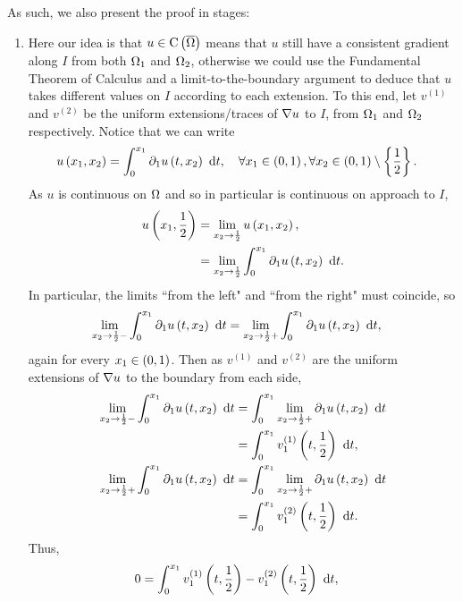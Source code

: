 \documentclass[11pt]{report}
\theoremstyle{plain}
\begin{document}
As such, we also present the proof in stages:
\begin{enumerate}
	\item Here our idea is that $u\in\mathrm{C}\left( \overline{\Omega} \right)$ means that $u$ still have a consistent gradient along $I$ from both $\Omega_1$ and $\Omega_2$, otherwise we could use the Fundamental Theorem of Calculus and a limit-to-the-boundary argument to deduce that $u$ takes different values on $I$ according to each extension.
	To this end, let $v^{(1)}$ and $v^{(2)}$ be the uniform extensions/traces of $\nabla u$ to $I$, from $\Omega_1$ and $\Omega_2$ respectively.
	Notice that we can write
	\begin{align}
		u\bracs{x_1,x_2} &= \int_0^{x_1} \partial_1 u\bracs{t,x_2} \ \md t,
		\quad \forall x_1\in\bracs{0,1}, \forall x_2\in\bracs{0,1}\setminus\clbracs{\recip{2}}.
	\end{align}
	As $u$ is continuous on $\Omega$ and so in particular is continuous on approach to $I$,
	\begin{align}
		u\left( x_1,\frac{1}{2} \right) &= \lim_{x_2\rightarrow \frac{1}{2}} u\left( x_1,x_2 \right), \\
		&= \lim_{x_2\rightarrow\frac{1}{2}} \int_0^{x_1} \partial_1 u\left( t,x_2 \right) \ \mathrm{d} t.
	\end{align}
	In particular, the limits ``from the left" and ``from the right" must coincide, so
	\begin{align}
		\lim_{x_2\rightarrow\frac{1}{2}-} \int_0^{x_1} \partial_1 u\left( t,x_2 \right) \ \mathrm{d} t 
		&= \lim_{x_2\rightarrow\frac{1}{2}+} \int_0^{x_1} \partial_1 u\left( t,x_2 \right) \ \mathrm{d} t,
	\end{align}
	again for every $x_1\in\left( 0,1 \right)$.
	Then as $v^{(1)}$ and $v^{(2)}$ are the uniform extensions of $\nabla u$ to the boundary from each side,
	\begin{align}
		\lim_{x_2\rightarrow\frac{1}{2}-} \int_0^{x_1} \partial_1 u\left( t,x_2 \right) \ \mathrm{d} t
		&= \int_0^{x_1} \lim_{x_2\rightarrow\frac{1}{2}+}\partial_1 u\left( t,x_2 \right) \ \mathrm{d} t \\
		&= \int_0^{x_1} v^{(1)}_1\left( t,\frac{1}{2} \right) \ \mathrm{d} t, \\
		\lim_{x_2\rightarrow\frac{1}{2}+} \int_0^{x_1} \partial_1 u\left( t,x_2 \right) \ \mathrm{d} t
		&= \int_0^{x_1} \lim_{x_2\rightarrow\frac{1}{2}+}\partial_1 u\left( t,x_2 \right) \ \mathrm{d} t \\
		&= \int_0^{x_1} v^{(2)}_1\left( t,\frac{1}{2} \right) \ \mathrm{d} t.	
	\end{align}
	Thus,
	\begin{align} \label{eq:TraceIntegrals}
		0 &= \int_0^{x_1} v^{(1)}_1\bracs{t,\recip{2}} - v^{(2)}_1\bracs{t,\recip{2}} \ \md t,

\end{align}
\end{enumerate}
\end{document}
